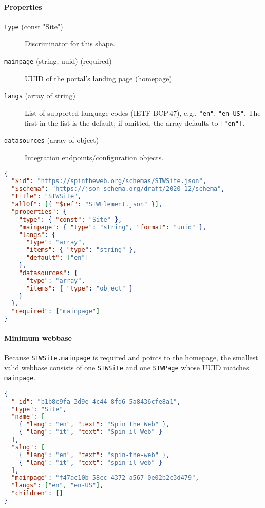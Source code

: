 \paragraph{Properties}
\begin{description}
  \item[\texttt{type} (const "Site")] Discriminator for this shape.
  \item[\texttt{mainpage} (string, uuid) (required)] UUID of the portal's landing page (homepage).
  \item[\texttt{langs} (array of string)] List of supported language codes (IETF BCP\,47), e.g., \texttt{"en"}, \texttt{"en-US"}. The first in the list is the default; if omitted, the array defaults to \texttt{["en"]}.
  \item[\texttt{datasources} (array of object)] Integration endpoints/configuration objects.
\end{description}
\begin{lstlisting}[language=JSON,caption={STWSite Schema Definition}]
{
  "$id": "https://spintheweb.org/schemas/STWSite.json",
  "$schema": "https://json-schema.org/draft/2020-12/schema",
  "title": "STWSite",
  "allOf": [{ "$ref": "STWElement.json" }],
  "properties": {
    "type": { "const": "Site" },
    "mainpage": { "type": "string", "format": "uuid" },
    "langs": {
      "type": "array",
      "items": { "type": "string" },
      "default": ["en"]
    },
    "datasources": {
      "type": "array",
      "items": { "type": "object" }
    }
  },
  "required": ["mainpage"]
}
\end{lstlisting}

\paragraph{Minimum webbase}\label{par:min-webbase}
Because \texttt{STWSite.mainpage} is required and points to the homepage, the smallest valid webbase consists of one \texttt{STWSite} and one \texttt{STWPage} whose UUID matches \texttt{mainpage}.

\begin{lstlisting}[language=JSON,caption={STWSite Example with explicit langs ["en", "en-US"]}]
{
  "_id": "b1b8c9fa-3d9e-4c44-8fd6-5a8436cfe8a1",
  "type": "Site",
  "name": [
    { "lang": "en", "text": "Spin the Web" },
    { "lang": "it", "text": "Spin il Web" }
  ],
  "slug": [
    { "lang": "en", "text": "spin-the-web" },
    { "lang": "it", "text": "spin-il-web" }
  ],
  "mainpage": "f47ac10b-58cc-4372-a567-0e02b2c3d479",
  "langs": ["en", "en-US"],
  "children": []
}
\end{lstlisting}


